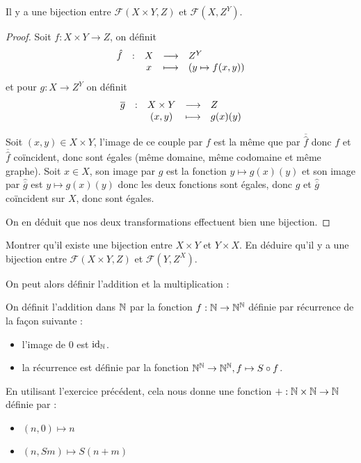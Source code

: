 \begin{lem}[Curryfication]
    Il y a une bijection entre $\mathcal F(X\times Y,Z)$ et $\mathcal F(X,Z^Y)$.
\end{lem}

\begin{proof}
    Soit $f : X\times Y \to Z$, on définit $$\begin{array}{rcccl} \hat f & : & X &\longrightarrow & Z^Y\\ & &x & \longmapsto & (y\mapsto f(x,y))\end{array}$$ et pour $g : X \to Z^Y$ on définit $$\begin{array}{rcccl} \overline g & : & X\times Y &\longrightarrow & Z\\ & &(x,y) & \longmapsto & g(x)(y)\end{array}$$

    Soit $(x,y)\in X\times Y$, l'image de ce couple par $f$ est la même que par $\overline{\hat f}$ donc $f$ et $\overline{\hat f}$ coïncident, donc sont égales (même domaine, même codomaine et même graphe). Soit $x\in X$, son image par $g$ est la fonction $y\mapsto g(x)(y)$ et son image par $\hat{\overline g}$ est $y\mapsto g(x)(y)$ donc les deux fonctions sont égales, donc $g$ et $\hat{\overline g}$ coïncident sur $X$, donc sont égales.

    On en déduit que nos deux transformations effectuent bien une bijection.
\end{proof}

\begin{exo}
    Montrer qu'il existe une bijection entre $X\times Y$ et $Y\times X$. En déduire qu'il y a une bijection entre $\mathcal F(X\times Y,Z)$ et $\mathcal F(Y,Z^X)$.
\end{exo}

On peut alors définir l'addition et la multiplication :

\begin{defi}[Addition]
    On définit l'addition dans $\mathbb{N}$ par la fonction $f : \mathbb{N}\to\mathbb{N}^{\mathbb{N}}$ définie par récurrence de la façon suivante : 
    \begin{itemize}[label=$\bullet$]
        \item l'image de $0$ est $\mathrm{id}_{\mathbb{N}}$.
        \item la récurrence est définie par la fonction $\mathbb{N}^{\mathbb{N}}\to\mathbb{N}^{\mathbb{N}}, f \mapsto S\circ f$.
    \end{itemize}

    En utilisant l'exercice précédent, cela nous donne une fonction $+ : \mathbb{N}\times \mathbb{N} \to \mathbb{N}$ définie par :
    \begin{itemize}[label=$\bullet$]
        \item $(n,0)\mapsto n$
        \item $(n,Sm)\mapsto S(n + m)$
    \end{itemize}
\end{defi}


